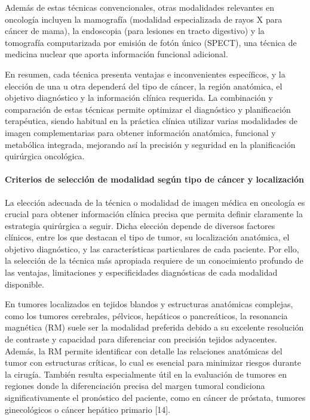 Además de estas técnicas convencionales, otras modalidades relevantes en oncología incluyen la mamografía (modalidad especializada de rayos X para cáncer de mama), la endoscopia (para lesiones en tracto digestivo) y la tomografía computarizada por emisión de fotón único (SPECT), una técnica de medicina nuclear que aporta información funcional adicional. 

En resumen, cada técnica presenta ventajas e inconvenientes específicos, y la elección de una u otra dependerá del tipo de cáncer, la región anatómica, el objetivo diagnóstico y la información clínica requerida. La combinación y comparación de estas técnicas permite optimizar el diagnóstico y planificación terapéutica, siendo habitual en la práctica clínica utilizar varias modalidades de imagen complementarias para obtener información anatómica, funcional y metabólica integrada, mejorando así la precisión y seguridad en la planificación quirúrgica oncológica\cite{Fang2022}. 

\paragraph{Criterios de selección de modalidad según tipo de cáncer y localización}

La elección adecuada de la técnica o modalidad de imagen médica en oncología es crucial para obtener información clínica precisa que permita definir claramente la estrategia quirúrgica a seguir. Dicha elección depende de diversos factores clínicos, entre los que destacan el tipo de tumor, su localización anatómica, el objetivo diagnóstico, y las características particulares de cada paciente. Por ello, la selección de la técnica más apropiada requiere de un conocimiento profundo de las ventajas, limitaciones y especificidades diagnósticas de cada modalidad disponible. 

En tumores localizados en tejidos blandos y estructuras anatómicas complejas, como los tumores cerebrales, pélvicos, hepáticos o pancreáticos, la resonancia magnética (RM) suele ser la modalidad preferida debido a su excelente resolución de contraste y capacidad para diferenciar con precisión tejidos adyacentes. Además, la RM permite identificar con detalle las relaciones anatómicas del tumor con estructuras críticas, lo cual es esencial para minimizar riesgos durante la cirugía. También resulta especialmente útil en la evaluación de tumores en regiones donde la diferenciación precisa del margen tumoral condiciona significativamente el pronóstico del paciente, como en cáncer de próstata, tumores ginecológicos o cáncer hepático primario [14]. 

